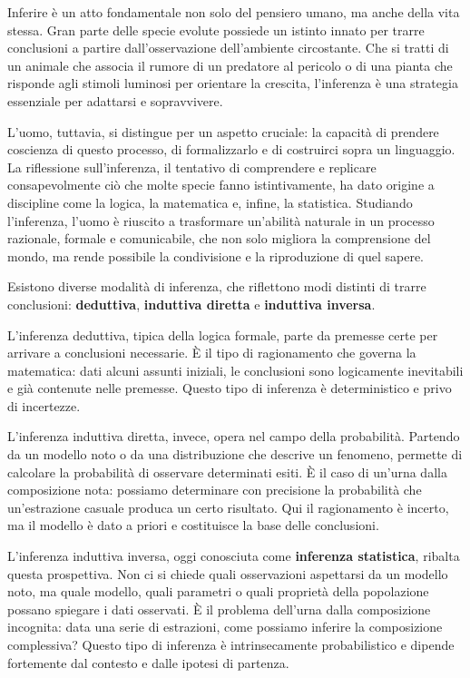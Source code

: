 \documentclass[
  11pt,
]{book}
\theoremstyle{mytheoremstyle}
\theoremstyle{mydefstyle}
\begin{document}
Inferire è un atto fondamentale non solo del pensiero umano, ma anche della vita stessa. Gran parte delle specie evolute possiede un istinto innato per trarre conclusioni a partire dall'osservazione dell'ambiente circostante. Che si tratti di un animale che associa il rumore di un predatore al pericolo o di una pianta che risponde agli stimoli luminosi per orientare la crescita, l'inferenza è una strategia essenziale per adattarsi e sopravvivere.

L'uomo, tuttavia, si distingue per un aspetto cruciale: la capacità di prendere coscienza di questo processo, di formalizzarlo e di costruirci sopra un linguaggio. La riflessione sull'inferenza, il tentativo di comprendere e replicare consapevolmente ciò che molte specie fanno istintivamente, ha dato origine a discipline come la logica, la matematica e, infine, la statistica. Studiando l'inferenza, l'uomo è riuscito a trasformare un'abilità naturale in un processo razionale, formale e comunicabile, che non solo migliora la comprensione del mondo, ma rende possibile la condivisione e la riproduzione di quel sapere.

Esistono diverse modalità di inferenza, che riflettono modi distinti di trarre conclusioni: \textbf{deduttiva}, \textbf{induttiva diretta} e \textbf{induttiva inversa}.

L'inferenza deduttiva, tipica della logica formale, parte da premesse certe per arrivare a conclusioni necessarie. È il tipo di ragionamento che governa la matematica: dati alcuni assunti iniziali, le conclusioni sono logicamente inevitabili e già contenute nelle premesse. Questo tipo di inferenza è deterministico e privo di incertezze.

L'inferenza induttiva diretta, invece, opera nel campo della probabilità. Partendo da un modello noto o da una distribuzione che descrive un fenomeno, permette di calcolare la probabilità di osservare determinati esiti. È il caso di un'urna dalla composizione nota: possiamo determinare con precisione la probabilità che un'estrazione casuale produca un certo risultato. Qui il ragionamento è incerto, ma il modello è dato a priori e costituisce la base delle conclusioni.

L'inferenza induttiva inversa, oggi conosciuta come \textbf{inferenza statistica}, ribalta questa prospettiva. Non ci si chiede quali osservazioni aspettarsi da un modello noto, ma quale modello, quali parametri o quali proprietà della popolazione possano spiegare i dati osservati. È il problema dell'urna dalla composizione incognita: data una serie di estrazioni, come possiamo inferire la composizione complessiva? Questo tipo di inferenza è intrinsecamente probabilistico e dipende fortemente dal contesto e dalle ipotesi di partenza.
\end{document}
